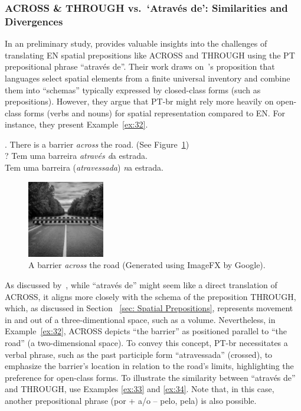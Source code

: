 {{\subsubsection{ACROSS \& THROUGH vs.\ `Através de': Similarities and Divergences}

In an preliminary study, \textcite{McCleary-Viotti-2004} provides valuable insights into the challenges of translating EN spatial prepositions like ACROSS and THROUGH using the PT prepositional phrase ``através de''. Their work draws on~\textcite{talmy2000towardb}'s proposition that languages select spatial elements from a finite universal inventory and combine them into ``schemas'' typically expressed by closed-class forms (such as prepositions). However, they argue that PT-br might rely more heavily on open-class forms (verbs and nouns) for spatial representation compared to EN. For instance, they present Example~\ref{ex:32}.

\ex. There is a barrier \emph{across} the road. (See Figure~\ref{fig:barrier}) \label{ex:32} \\
     ? Tem uma barreira \emph{através d}a estrada. \\
     Tem uma barreira (\emph{atravessada}) \emph{n}a estrada.

\begin{figure}[ht]
    \centering
    \includegraphics[width=0.3\textwidth]{textual/Figuras/image_fx_a_barrier_across_the_road_black_and_white.jpg}
    \caption{A barrier \emph{across} the road (Generated using ImageFX by Google).}
    \label{fig:barrier}
\end{figure}
    
As discussed by~\textcite{McCleary-Viotti-2004}, while ``através de'' might seem like a direct translation of ACROSS, it aligns more closely with the schema of the preposition THROUGH, which, as discussed in Section~ \ref{sec: Spatial Prepositions}, represents movement in and out of a three-dimentional space, such as a volume. Nevertheless, in Example~\ref{ex:32}, ACROSS depicts ``the barrier'' as positioned parallel to ``the road'' (a two-dimensional space). To convey this concept, PT-br necessitates a verbal phrase, such as the past participle form ``atravessada'' (crossed), to emphasize the barrier's location in relation to the road's limits, highlighting the preference for open-class forms. To illustrate the similarity between ``através de'' and THROUGH, \textcite{McCleary-Viotti-2004} use Examples \ref{ex:33} and \ref{ex:34}. Note that, in this case, another prepositional phrase (por + a/o -- pelo, pela) is also possible.

}}

